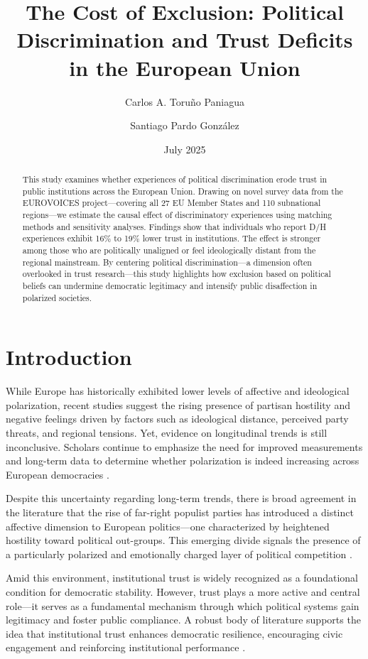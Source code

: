 \documentclass{article}
\title{The Cost of Exclusion: Political Discrimination and Trust Deficits in the European Union}
\author{Carlos A. Toruño Paniagua}
\author{Santiago Pardo González}
\affil{\emph{The World Justice Project}}
\date{July 2025}
\begin{document}
\maketitle

\begin{abstract}
This study examines whether experiences of political discrimination erode trust in public institutions across the European Union. Drawing on novel survey data from the EUROVOICES project—covering all 27 EU Member States and 110 subnational regions—we estimate the causal effect of discriminatory experiences using matching methods and sensitivity analyses. Findings show that individuals who report D/H experiences exhibit 16\% to 19\% lower trust in institutions. The effect is stronger among those who are politically unaligned or feel ideologically distant from the regional mainstream. By centering political discrimination—a dimension often overlooked in trust research—this study highlights how exclusion based on political beliefs can undermine democratic legitimacy and intensify public disaffection in polarized societies.
\end{abstract}

\section{Introduction}

While Europe has historically exhibited lower levels of affective and ideological polarization, recent studies suggest the rising presence of partisan hostility and negative feelings driven by factors such as ideological distance, perceived party threats, and regional tensions. Yet, evidence on longitudinal trends is still inconclusive. Scholars continue to emphasize the need for improved measurements and long-term data to determine whether polarization is indeed increasing across European democracies \parencite{wagner_affective_2024}.

Despite this uncertainty regarding long-term trends, there is broad agreement in the literature that the rise of far-right populist parties has introduced a distinct affective dimension to European politics—one characterized by heightened hostility toward political out-groups. This emerging divide signals the presence of a particularly polarized and emotionally charged layer of political competition \parencite{reiljan_fear_2020, reiljan_andres_affective_2025}.

Amid this environment, institutional trust is widely recognized as a foundational condition for democratic stability. However, trust plays a more active and central role—it serves as a fundamental mechanism through which political systems gain legitimacy and foster public compliance. A robust body of literature supports the idea that institutional trust enhances democratic resilience, encouraging civic engagement and reinforcing institutional performance \parencite{marien_measuring_2011, devine_stability_2024}.
\end{document}
